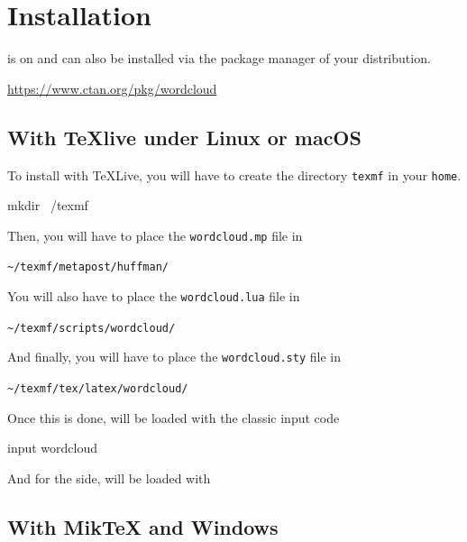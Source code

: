 \documentclass[english]{ltxdoc}
\begin{document}
\section{Installation}

\wordcloudpkg is on \ctan{} and can also be installed via the package manager of your
distribution.

\begin{center}
  \url{https://www.ctan.org/pkg/wordcloud}
\end{center}


\subsection{With \TeX live under Linux or macOS}

To install \wordcloudpkg with \TeX Live, you will have to create the directory
\lstinline+texmf+  in your \lstinline+home+. 

\begin{commandshell}
mkdir ~/texmf
\end{commandshell}

Then, you will have to place the \lstinline+wordcloud.mp+ file in 
\begin{center}
  \lstinline+~/texmf/metapost/huffman/+
\end{center}


You will also have to place the \lstinline+wordcloud.lua+ file in 
\begin{center}
  \lstinline+~/texmf/scripts/wordcloud/+
\end{center}

And finally, you will have to place the \lstinline+wordcloud.sty+ file in 
\begin{center}
  \lstinline+~/texmf/tex/latex/wordcloud/+
\end{center}



Once this is done, \wordcloudpkg will be loaded with the classic \MP{}
input code
\begin{mpcode}
input wordcloud
\end{mpcode}

And for the  side, \wordcloudpkg will be loaded with
\begin{latexcode}
\usepackage{wordcloud}
\end{latexcode}

\subsection{With Mik\TeX{} and Windows}
\end{document}
